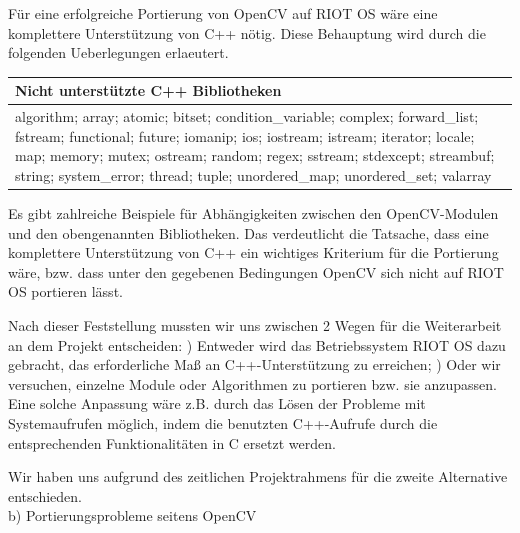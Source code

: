 \documentclass[10pt,a4paper]{article}
\begin{document}
Für eine erfolgreiche Portierung von OpenCV auf RIOT OS wäre eine komplettere Unterstützung von C++ nötig. Diese Behauptung wird durch die folgenden Ueberlegungen erlaeutert.

\begin{center}
  \begin{tabular}{ | p{10cm} | }
    \hline
    Nicht unterstützte C++ Bibliotheken \\ \hline

algorithm; array; atomic; bitset; condition\_variable; complex; \newline
forward\_list; fstream; functional; future; iomanip; ios; iostream; \newline 
istream; iterator; locale; map; memory; mutex; ostream; random; \newline
regex; sstream; stdexcept; streambuf; string; system\_error; \newline
thread; tuple; unordered\_map; unordered\_set; valarray \\

    \hline
  \end{tabular}
\end{center}

Es gibt zahlreiche Beispiele für Abhängigkeiten zwischen den OpenCV-Modulen und den obengenannten Bibliotheken. Das verdeutlicht die Tatsache, dass eine komplettere Unterstützung von C++ ein wichtiges Kriterium für die Portierung wäre, bzw. dass unter den gegebenen Bedingungen OpenCV sich nicht auf RIOT OS portieren lässt. \newline

Nach dieser Feststellung mussten wir uns zwischen 2 Wegen für die Weiterarbeit an dem Projekt entscheiden: ) Entweder wird das Betriebssystem RIOT OS dazu gebracht, das erforderliche Maß an C++-Unterstützung zu erreichen; ) Oder wir versuchen, einzelne Module oder Algorithmen zu portieren bzw. sie anzupassen. Eine solche Anpassung wäre z.B. durch das Lösen der Probleme mit Systemaufrufen möglich, indem die benutzten C++-Aufrufe durch die entsprechenden Funktionalitäten in C ersetzt werden.\newline

Wir haben uns aufgrund des zeitlichen Projektrahmens für die zweite Alternative entschieden. \\

b) Portierungsprobleme seitens OpenCV \newline
\end{document}
